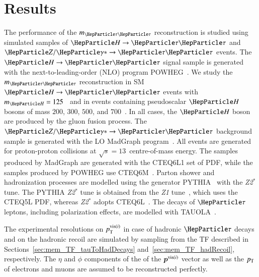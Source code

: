\section{Results}
\label{sec:results}

The performance of the $m_{\Pgt\Pgt}$ reconstruction is studied using
simulated samples of $\PHiggs \to \Pgt\Pgt$ and $\PZ/\Pggx \to
\Pgt\Pgt$ events.
The $\PHiggs \to \Pgt\Pgt$ signal sample is generated with the next-to-leading-order (NLO) program POWHEG~\cite{POWHEG1,POWHEG2,POWHEG3}.
We study the $m_{\Pgt\Pgt}$ reconstruction in SM $\PHiggs \to \Pgt\Pgt$ events with $m_{\PHiggs} = 125$~\GeV
and in events containing pseudoscalar $\PHiggs$ bosons of mass $200$, $300$, $500$, and $700$~\GeV.
In all cases, the $\PHiggs$ boson are produced by the gluon fusion process.
The $\PZ/\Pggx \to \Pgt\Pgt$ background sample is generated with the LO MadGraph program~\cite{MadGraph}.
All events are generated for proton-proton collisions at $\sqrt{s} = 13$~\TeV centre-of-mass energy.
The samples produced by MadGraph are generated with the CTEQ6L1 set of PDF,
while the samples produced by POWHEG use CTEQ6M~\cite{CTEQ6}.
Parton shower and hadronization processes are modelled using the generator PYTHIA~\cite{pythia8} with the \emph{Z2$^{*}$} tune.
The PYTHIA \emph{Z2$^{*}$} tune is obtained from the \emph{Z1} tune~\cite{PYTHIA_Z1tune_CMS},
which uses the CTEQ5L PDF, 
whereas \emph{Z2$^{*}$} adopts CTEQ6L~\cite{CTEQ6}.
The decays of $\Pgt$ leptons, including polarization effects, are modelled with TAUOLA~\cite{tauola}.

The experimental resolutions on $p_{\textrm{T}}^{\textrm{vis}(i)}$ in case of hadronic
$\Pgt$ decays and on the hadronic recoil 
are simulated by sampling from the TF described in
Sections~\ref{sec:mem_TF_tauToHadDecays}
and~\ref{sec:mem_TF_hadRecoil}, respectively.
The $\eta$ and $\phi$ components of the of the $\bm{p}^{\textrm{vis}(i)}$ vector as well as the $p_{\textrm{T}}$ of electrons and muons are assumed to be reconstructed perfectly.

